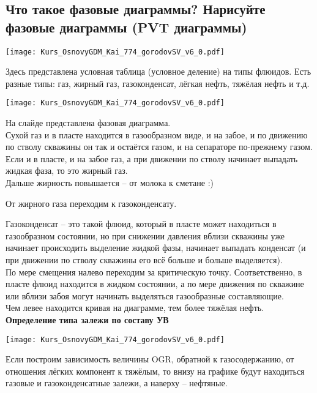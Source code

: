 

\subsection{Что такое фазовые диаграммы? Нарисуйте фазовые диаграммы (PVT диаграммы)}

\texttt{[image: Kurs\_OsnovyGDM\_Kai\_774\_gorodovSV\_v6\_0.pdf]}

Здесь представлена условная таблица (условное деление) на типы флюидов.
Есть разные типы: газ, жирный газ, газоконденсат, лёгкая нефть, тяжёлая нефть и т.д.

\texttt{[image: Kurs\_OsnovyGDM\_Kai\_774\_gorodovSV\_v6\_0.pdf]}

На слайде представлена фазовая диаграмма.
\\

Сухой газ и в пласте находится в газообразном виде, и на забое, и по движению по стволу скважины он так и остаётся газом, и на сепараторе по-прежнему газом.
\\

Если и в пласте, и на забое газ, а при движении по стволу начинает выпадать жидкая фаза, то это жирный газ.
\\

Дальше жирность повышается -- от молока к сметане :)

От жирного газа переходим к газоконденсату.

Газоконденсат -- это такой флюид, который в пласте может находиться в газообразном состоянии, но при снижении давления вблизи скважины уже начинает происходить выделение жидкой фазы, начинает выпадать конденсат (и при движении по стволу скважины его всё больше и больше выделяется).
\\

По мере смещения налево переходим за критическую точку.
Соответственно, в пласте флюид находится в жидком состоянии, а по мере движения по скважине или вблизи забоя могут начинать выделяться газообразные составляющие.
\\

Чем левее находится кривая на диаграмме, тем более тяжёлая нефть.
\\

\textbf{Определение типа залежи по составу УВ}

\texttt{[image: Kurs\_OsnovyGDM\_Kai\_774\_gorodovSV\_v6\_0.pdf]}

Если построим зависимость величины OGR, обратной к газосодержанию, от отношения лёгких компонент к тяжёлым, то внизу на графике будут находиться газовые и газоконденсатные залежи, а наверху -- нефтяные.


